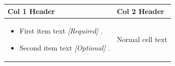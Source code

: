 \documentclass[11pt,a4paper]{article}
\begin{document}
\begin{table}[h]
\begin{tabular}{|l|l|}
\hline
Col 1 Header & Col 2 Header \\ \hline
\begin{itemize} \item First item text \textit{[Required]} . \end{itemize}  \begin{itemize} \item Second item text \textit{[Optional]} . \end{itemize} & Normal cell text \\ \hline
\end{tabular}
\end{table}
\end{document}
